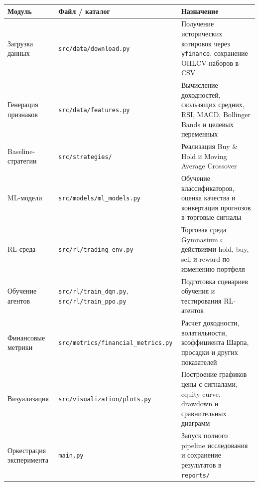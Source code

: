 \begin{center}
\small
\begin{tabularx}{\textwidth}{|p{4cm}|p{4cm}|X|}
\hline
\textbf{Модуль} & \textbf{Файл / каталог} & \textbf{Назначение} \\
\hline
Загрузка данных & \texttt{src/data/download.py} & Получение исторических котировок через \texttt{yfinance}, сохранение OHLCV-наборов в CSV \\
\hline
Генерация признаков & \texttt{src/data/features.py} & Вычисление доходностей, скользящих средних, RSI, MACD, Bollinger Bands и целевых переменных \\
\hline
Baseline-стратегии & \texttt{src/strategies/} & Реализация Buy \& Hold и Moving Average Crossover \\
\hline
ML-модели & \texttt{src/models/ml\_models.py} & Обучение классификаторов, оценка качества и конвертация прогнозов в торговые сигналы \\
\hline
RL-среда & \texttt{src/rl/trading\_env.py} & Торговая среда Gymnasium с действиями hold, buy, sell и reward по изменению портфеля \\
\hline
Обучение агентов & \texttt{src/rl/train\_dqn.py}, \texttt{src/rl/train\_ppo.py} & Подготовка сценариев обучения и тестирования RL-агентов \\
\hline
Финансовые метрики & \texttt{src/metrics/financial\_metrics.py} & Расчет доходности, волатильности, коэффициента Шарпа, просадки и других показателей \\
\hline
Визуализация & \texttt{src/visualization/plots.py} & Построение графиков цены с сигналами, equity curve, drawdown и сравнительных диаграмм \\
\hline
Оркестрация эксперимента & \texttt{main.py} & Запуск полного pipeline исследования и сохранение результатов в \texttt{reports/} \\
\hline
\end{tabularx}
\end{center}
